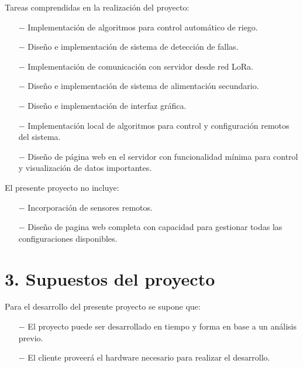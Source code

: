 \documentclass[11pt]{charter}
\begin{document}
Tareas comprendidas en la realización del proyecto:
\begin{itemize}
 \item[$-$] Implementación de algoritmos para control automático de riego.
\item[$-$] Diseño e implementación de sistema de detección de fallas.
\item[$-$] Implementación de comunicación con servidor desde red LoRa.
\item[$-$] Diseño e implementación de sistema de alimentación secundario.
\item[$-$] Diseño e implementación de interfaz gráfica.
\item[$-$] Implementación local de algoritmos para control y configuración remotos del sistema.
\item[$-$] Diseño de página web en el servidor con funcionalidad mínima para control y visualización de datos importantes.
\end{itemize}


El presente proyecto no incluye:
\begin{itemize}
\item[$-$] Incorporación de sensores remotos.
\item[$-$] Diseño de pagina web completa con capacidad para gestionar todas las configuraciones disponibles.
\end{itemize}

\section{3. Supuestos del proyecto}
\label{sec:supuestos}



Para el desarrollo del presente proyecto se supone que:
\begin{itemize}
\item[$-$] El proyecto puede ser desarrollado en tiempo y forma en base a un análisis previo.
\item[$-$] El cliente proveerá el hardware necesario para realizar el desarrollo.
\end{itemize}
\end{document}
